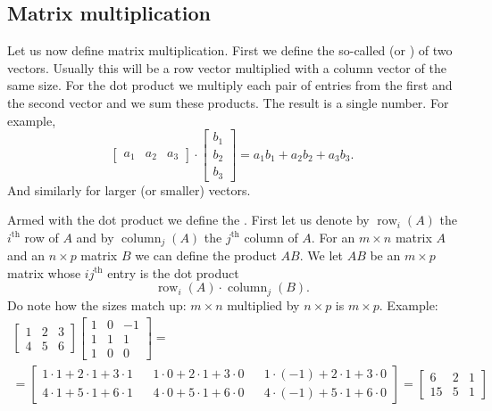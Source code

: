 \subsection{Matrix multiplication}

Let us now define matrix multiplication.  First we define the so-called
\emph{} (or \emph{}) of two vectors.
Usually this will be a row vector multiplied
with a column vector of the same size.  For the dot product we multiply
each pair of entries from the first and the second vector and we sum these
products.  The result is a single number.
For example,
\begin{equation*}
\begin{bmatrix}
a_1 & a_2 & a_3
\end{bmatrix}
\cdot
\begin{bmatrix}
b_1 \\
b_2 \\
b_3
\end{bmatrix}
= a_1 b_1 + a_2 b_2 + a_3 b_3 .
\end{equation*}
And similarly for larger (or smaller) vectors.

Armed with the dot product we define the
\emph{}.
First let us denote by $\operatorname{row}_i(A)$ the $i^{\text{th}}$ row
of $A$ and by
$\operatorname{column}_j(A)$ the $j^{\text{th}}$ column of $A$.
For an $m \times n$ matrix $A$ and an $n \times p$ matrix $B$
we can define the product $AB$.  We let $AB$ be an $m \times p$
matrix whose $ij^{\text{th}}$ entry is the dot product
\begin{equation*}
\operatorname{row}_i(A) \cdot
\operatorname{column}_j(B) .
\end{equation*}
Do note how the sizes match up: $m \times n$ multiplied by $n \times p$ is 
$m \times p$.  Example:
\begin{multline*}
\begin{bmatrix}
1 & 2 & 3 \\
4 & 5 & 6
\end{bmatrix}
\begin{bmatrix}
1 & 0 & -1 \\
1 & 1 & 1 \\
1 & 0 & 0
\end{bmatrix}
= \\ =
\begin{bmatrix}
1\cdot 1 + 2\cdot 1 + 3 \cdot 1 &  &
1\cdot 0 + 2\cdot 1 + 3 \cdot 0 &  &
1\cdot (-1) + 2\cdot 1 + 3 \cdot 0 \\
4\cdot 1 + 5\cdot 1 + 6 \cdot 1 &  &
4\cdot 0 + 5\cdot 1 + 6 \cdot 0 &  &
4\cdot (-1) + 5\cdot 1 + 6 \cdot 0
\end{bmatrix}
=
\begin{bmatrix}
6 & 2 & 1 \\
15 & 5 & 1
\end{bmatrix}
\end{multline*}

